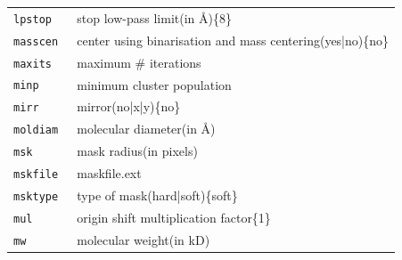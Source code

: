 \documentclass[a4paper,11pt]{article}
\begin{document}
\begin{tabular}{ll}
\texttt{lpstop          }&{ stop low-pass limit(in \AA{})\{8\}}\\
\texttt{masscen         }&{ center using binarisation and mass centering(yes|no)\{no\}}\\
\texttt{maxits          }&{ maximum \# iterations}\\
\texttt{minp            }&{ minimum cluster population}\\
\texttt{mirr            }&{ mirror(no|x|y)\{no\}}\\
\texttt{moldiam         }&{ molecular diameter(in \AA{})}\\
\texttt{msk             }&{ mask radius(in pixels)}\\
\texttt{mskfile         }&{ maskfile.ext}\\
\texttt{msktype         }&{ type of mask(hard|soft)\{soft\}}\\
\texttt{mul             }&{ origin shift multiplication factor\{1\}}\\
\texttt{mw              }&{ molecular weight(in kD)}\\
\end{tabular}
\end{document}
